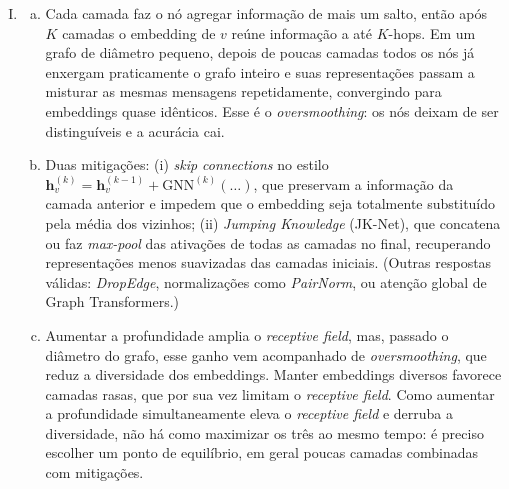 \documentclass{dlproblemset}
\begin{document}
\begin{enumerate}[I)]
    \item
    \begin{enumerate}[(a)]
        \item Cada camada faz o nó agregar informação de mais um salto, então após $K$ camadas o embedding de $v$ reúne informação a até $K$-hops. Em um grafo de diâmetro pequeno, depois de poucas camadas todos os nós já enxergam praticamente o grafo inteiro e suas representações passam a misturar as mesmas mensagens repetidamente, convergindo para embeddings quase idênticos. Esse é o \textit{oversmoothing}: os nós deixam de ser distinguíveis e a acurácia cai.
        \item Duas mitigações: (i) \textit{skip connections} no estilo $\mathbf{h}^{(k)}_v = \mathbf{h}^{(k-1)}_v + \mathrm{GNN}^{(k)}(\ldots)$, que preservam a informação da camada anterior e impedem que o embedding seja totalmente substituído pela média dos vizinhos; (ii) \textit{Jumping Knowledge} (JK-Net), que concatena ou faz \textit{max-pool} das ativações de todas as camadas no final, recuperando representações menos suavizadas das camadas iniciais. (Outras respostas válidas: \textit{DropEdge}, normalizações como \textit{PairNorm}, ou atenção global de Graph Transformers.)
        \item Aumentar a profundidade amplia o \textit{receptive field}, mas, passado o diâmetro do grafo, esse ganho vem acompanhado de \textit{oversmoothing}, que reduz a diversidade dos embeddings. Manter embeddings diversos favorece camadas rasas, que por sua vez limitam o \textit{receptive field}. Como aumentar a profundidade simultaneamente eleva o \textit{receptive field} e derruba a diversidade, não há como maximizar os três ao mesmo tempo: é preciso escolher um ponto de equilíbrio, em geral poucas camadas combinadas com mitigações.
    \end{enumerate}
\end{enumerate}

\color{black}
\end{document}

